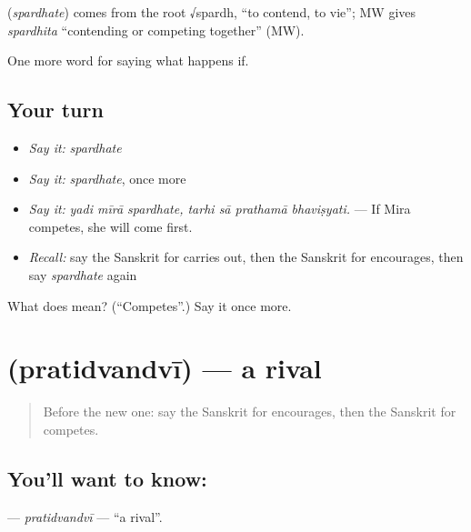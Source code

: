 \begin{cousinweb}
\textbf{} (\emph{spardhate}) comes from the root √spardh, \textquotedblleft{}to contend, to vie\textquotedblright{}; MW gives \emph{spardhita} \textquotedblleft{}contending or competing together\textquotedblright{} (MW).
\end{cousinweb}

\begin{grammarlens}[title={What you've built}]
One more word for saying what happens if.
\end{grammarlens}

\subsection*{Your turn}
\begin{itemize}
\raggedright
  \item \emph{Say it:} \emph{spardhate}
  \item \emph{Say it:} \emph{spardhate}, once more
  \item \emph{Say it:} \emph{yadi mīrā spardhate, tarhi sā prathamā bhaviṣyati.} — If Mira competes, she will come first.
  \item \emph{Recall:} say the Sanskrit for carries out, then the Sanskrit for encourages, then say \emph{spardhate} again
\end{itemize}

\begin{tcolorbox}[breakable,colback=teal!4,colframe=teal!35!black,title={Before you move on}]
What does  mean? (\textquotedblleft{}Competes\textquotedblright{}.) Say it once more.
\end{tcolorbox}
\section[\texorpdfstring{\sk{प्रतिद्वन्द्वी} (pratidvandvī)}{प्रतिद्वन्द्वी (pratidvandvī)}]{ (pratidvandvī) — a rival}

\label{lesson:SA-C385-pratidvandvi}



\begin{quote}
Before the new one: say the Sanskrit for encourages, then the Sanskrit for competes.
\end{quote}

\subsection*{You'll want to know: }
\textbf{} — \emph{pratidvandvī} — \textquotedblleft{}a rival\textquotedblright{}.

